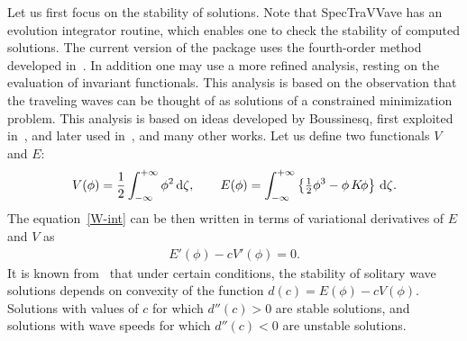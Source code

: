 Let us first focus on the stability of solutions.
Note that \textsf{SpecTraVVave} has an evolution integrator routine, 
which enables one to check the stability of computed solutions. 	
The current version of the package uses the fourth-order method developed in~\cite{DeFrutos1992}.
In addition one may use a more refined analysis, resting on the evaluation
of invariant functionals. This analysis is based on the observation
that the traveling waves can be thought of as solutions of a constrained
minimization problem. This analysis is based on ideas developed by
Boussinesq, first exploited in~\cite{Benjamin1972j}, and later used 
in~\cite{Bona1987,Bridges2004,Nguyen2009}, and many other works.
Let us define two functionals $V$ and $E$:
\begin{align*}
	V( \phi) = \frac{1}{2} \int_{-\infty}^{+\infty} \phi^2\,\mathrm{d}\zeta, \qquad
	E( \phi) = \int_{-\infty}^{+\infty} \left\{ {\textstyle{\frac{1}{2}}} \phi^3 - \phi \, K\!  \phi \right\}\, \mathrm{d}\zeta.
\end{align*}
The equation~\eqref{W-int} can be then written in terms of variational derivatives of $E$ and $V$
as
\begin{align}
	E' ( \phi ) - c V ' ( \phi ) = 0.
\label{zero}
\end{align} 
It is known from~\cite{Bona1987} that under certain conditions,
the stability of solitary wave solutions depends 
on convexity of the function $d(c) = E(\phi) - c V(\phi)$. 
Solutions with values of $c$ for which $d''(c) > 0$  are stable solutions,
and solutions with wave speeds for which $d''(c) <0$ are unstable solutions.
	
